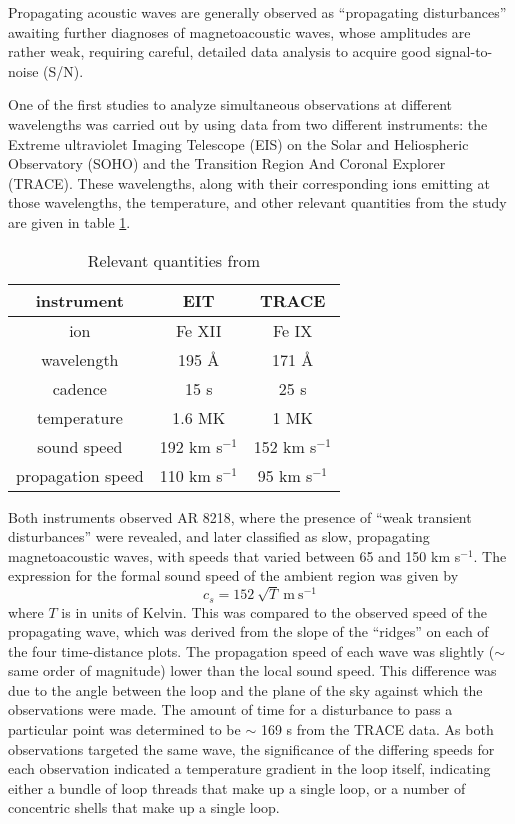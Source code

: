 \documentclass[preprint2]{aastex}
\begin{document}
Propagating acoustic waves are generally observed as ``propagating
disturbances'' awaiting further diagnoses of magnetoacoustic waves,
whose amplitudes are rather weak, requiring careful, detailed data
analysis to acquire good signal-to-noise (S/N).

One of the first studies to analyze
simultaneous observations at different wavelengths was carried out by
\cite{pac_1} using data from two different instruments:
the Extreme ultraviolet Imaging Telescope (EIS)
on the Solar and Heliospheric Observatory (SOHO) and the
Transition Region And Coronal Explorer (TRACE).
These wavelengths, along with their corresponding ions emitting at those
wavelengths, the temperature, and other relevant quantities from the
study are given in table {\ref{stuff}}.
\begin{table}[h]
\centering
\begin{tabular}{c c c}
\hline\hline
instrument & EIT & TRACE\\
\hline
ion & Fe {\footnotesize XII} & Fe {\footnotesize IX}\\
wavelength & 195 \AA{} & 171 \AA{}\\
cadence & 15 s & 25 s\\
temperature & 1.6 MK & 1 MK\\
sound speed & 192 km s$^{-1}$ & 152 km s$^{-1}$\\
propagation speed & 110 km s$^{-1}$ & 95 km s$^{-1}$\\
\hline\hline
\end{tabular}
\caption{Relevant quantities from \cite{pac_1}}
\label{stuff}
\end{table}
Both instruments observed AR 8218, where the presence of
``weak transient disturbances'' were revealed, and later classified as
slow, propagating magnetoacoustic waves, with speeds that varied
between 65 and 150 km s$^{-1}$.
The expression for the formal sound speed of the ambient region
was given by
\begin{equation}
    c_{s} = 152\ \sqrt{T}\ \textrm{m}\ \textrm{s}^{-1}
\end{equation}
where $T$ is in units of Kelvin.
This was compared to the observed speed of the propagating wave, which
was derived from the slope of the ``ridges'' on each of the four
time-distance plots.
The propagation speed of each wave was slightly ($\sim$ same order of
magnitude) lower than the local sound speed. This difference
was due to the angle between the loop and the plane of the sky against
which the observations were made.
The amount of time for a disturbance to pass a particular point was
determined to be $\sim$ 169 s from the TRACE data.
As both observations targeted the same wave, the significance of the
differing speeds for each observation indicated a temperature gradient
in the loop itself, indicating either a bundle of loop threads that
make up a single loop, or a number of concentric shells that make up a
single loop.
\end{document}
